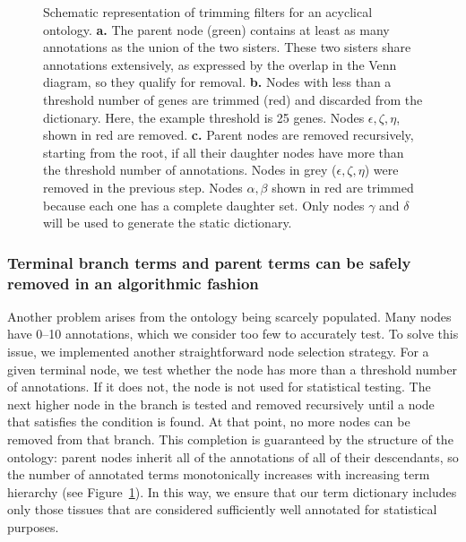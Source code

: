 \begin{figure}
  \centering{}
  \caption{Schematic representation of trimming filters for an acyclical
           ontology.
    \textbf{a.}
    The parent node (green) contains at least as many
    annotations as the union of the two sisters. These two sisters share
    annotations extensively, as expressed by the overlap in the Venn diagram,
    so they qualify for removal.
  	\textbf{b.}
    Nodes with less than a threshold number of genes are
    trimmed (red) and discarded from the dictionary. Here, the example threshold
    is 25 genes. Nodes $\epsilon, \zeta, \eta$, shown in red are removed.
  	\textbf{c.}
    Parent nodes are removed recursively, starting from
    the root, if all their daughter nodes have more than the threshold number of
    annotations. Nodes in grey ($\epsilon, \zeta, \eta$) were removed in the
    previous step. Nodes $\alpha, \beta$ shown in red are trimmed because each one
    has a complete daughter set. Only nodes $\gamma$ and $\delta$ will be used to
    generate the static dictionary.}
\label{fig:simdiagram}
\end{figure}


\subsubsection*{Terminal branch terms and parent terms can be
safely removed in an algorithmic fashion }
Another problem arises from the ontology being scarcely populated. Many nodes
have 0--10 annotations, which we consider too few to accurately test. To solve
this issue, we implemented another straightforward node selection strategy. For
a given terminal node, we test whether the node has more than a threshold number
of annotations. If it does not, the node is not used for statistical testing.
The next higher node in the branch is tested and removed recursively until a
node that satisfies the condition is found. At that point, no more nodes can be
removed from that branch. This completion is guaranteed by the structure of the
ontology: parent nodes inherit all of the annotations of all of their
descendants, so the number of annotated terms monotonically increases with
increasing term hierarchy (see Figure~\ref{fig:simdiagram}). In this way, we
ensure that our term dictionary includes only those tissues that are considered
sufficiently well annotated for statistical purposes.

